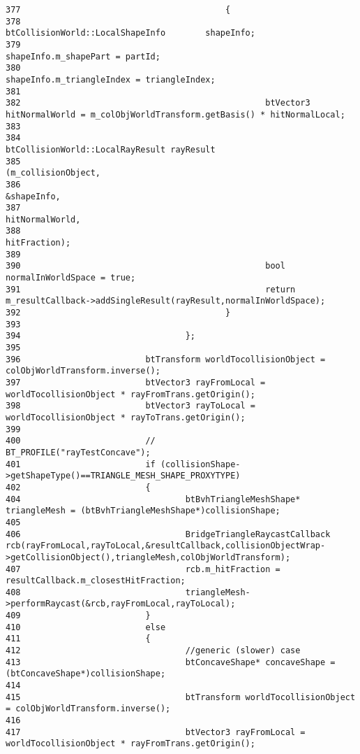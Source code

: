 \begin{Code}
\begin{verbatim}
377                                         {
378                                                 btCollisionWorld::LocalShapeInfo        shapeInfo;
379                                                 shapeInfo.m_shapePart = partId;
380                                                 shapeInfo.m_triangleIndex = triangleIndex;
381 
382                                                 btVector3 hitNormalWorld = m_colObjWorldTransform.getBasis() * hitNormalLocal;
383 
384                                                 btCollisionWorld::LocalRayResult rayResult
385                                                         (m_collisionObject,
386                                                         &shapeInfo,
387                                                         hitNormalWorld,
388                                                         hitFraction);
389 
390                                                 bool    normalInWorldSpace = true;
391                                                 return m_resultCallback->addSingleResult(rayResult,normalInWorldSpace);
392                                         }
393 
394                                 };
395 
396                         btTransform worldTocollisionObject = colObjWorldTransform.inverse();
397                         btVector3 rayFromLocal = worldTocollisionObject * rayFromTrans.getOrigin();
398                         btVector3 rayToLocal = worldTocollisionObject * rayToTrans.getOrigin();
399 
400                         //                      BT_PROFILE("rayTestConcave");
401                         if (collisionShape->getShapeType()==TRIANGLE_MESH_SHAPE_PROXYTYPE)
402                         {
404                                 btBvhTriangleMeshShape* triangleMesh = (btBvhTriangleMeshShape*)collisionShape;
405                                 
406                                 BridgeTriangleRaycastCallback rcb(rayFromLocal,rayToLocal,&resultCallback,collisionObjectWrap->getCollisionObject(),triangleMesh,colObjWorldTransform);
407                                 rcb.m_hitFraction = resultCallback.m_closestHitFraction;
408                                 triangleMesh->performRaycast(&rcb,rayFromLocal,rayToLocal);
409                         }
410                         else
411                         {
412                                 //generic (slower) case
413                                 btConcaveShape* concaveShape = (btConcaveShape*)collisionShape;
414 
415                                 btTransform worldTocollisionObject = colObjWorldTransform.inverse();
416 
417                                 btVector3 rayFromLocal = worldTocollisionObject * rayFromTrans.getOrigin();

\end{verbatim}
\end{Code}

